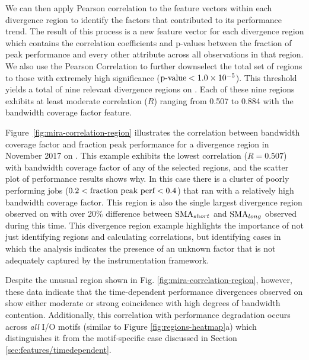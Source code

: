 We can then apply Pearson correlation to the feature vectors within
each divergence region to identify the factors that contributed to its
performance trend.  The result of this process is a new feature vector
for each divergence region which contains the correlation coefficients
and p-values between the fraction of peak performance and every other
attribute across all observations in that region.  We also use the Pearson
Correlation to further downselect the total set of regions to those 
with extremely high significance
($\textup{p-value} < {1.0 \times 10^{-5}}$).  This threshold yields a total
of nine relevant divergence regions on \mira \mirafsone.  Each of these nine
regions exhibits at least moderate correlation ($R$) ranging from 0.507 to
0.884 with the bandwidth coverage factor feature.

Figure~\ref{fig:mira-correlation-region} illustrates the correlation
between bandwidth coverage factor and fraction peak performance for a
divergence region in November 2017 on \mira \mirafsone.  This example
exhibits the lowest correlation ($R = 0.507$) with bandwidth coverage
factor of any of the selected regions, and the scatter plot of performance
results shows why.  In this case there is a cluster of poorly performing
jobs (${0.2 < \textup{fraction peak perf} < 0.4}$) that ran with a
relatively high bandwidth coverage factor.  This region is also the
single largest divergence region observed on \mira with over 20\%
difference between $\textup{SMA}_{short}$ and $\textup{SMA}_{long}$
observed during this time.  This divergence region example highlights the importance of not
just identifying regions and calculating correlations, but identifying cases
in which the analysis indicates the presence of an unknown factor that is
not adequately captured by the instrumentation framework.

Despite the unusual region shown in Fig. \ref{fig:mira-correlation-region},
however, these data indicate that the time-dependent performance divergences observed on \mira show either moderate or strong coincidence with high degrees of bandwidth contention.
Additionally, this correlation with performance degradation occurs across
\emph{all} I/O motifs (similar to Figure \ref{fig:regions-heatmap}a) which
distinguishes it from the motif-specific case discussed in Section
\ref{sec:features/timedependent}.  

